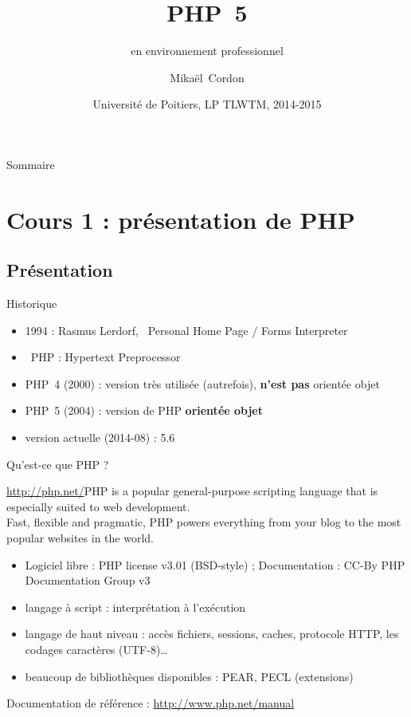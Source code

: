 \documentclass{beamer}
\title{PHP~5}
\subtitle{en environnement professionnel}
\author{Mikaël~Cordon}
\date{Université de Poitiers, LP TLWTM, 2014-2015}
\begin{document}
\begin{frame}
  \titlepage
\end{frame}

\begin{frame}{Sommaire}
  \tableofcontents[subsectionstyle=hide,subsubsectionstyle=hide]
\end{frame}

\section{Cours \textnumero{}1 : présentation de PHP}
\subsection{Présentation}
\begin{frame}{Historique}
    \begin{itemize}
	    \item 1994 : Rasmus Lerdorf, \og~Personal Home Page / Forms Interpreter~\fg
    	\item \og~PHP : Hypertext Preprocessor~\fg 
    	\item PHP~4 (2000) : version très utilisée (autrefois), \textbf{n’est pas} orientée objet
    	\item PHP~5 (2004) : version de PHP \textbf{orientée objet}
    	\item version actuelle (2014-08) : 5.6
    \end{itemize}
\end{frame}

\begin{frame}{Qu'est-ce que PHP ?}
    \begin{block}{\url{http://php.net/}}PHP is a popular general-purpose scripting language that is especially suited to web development.\\Fast, flexible and pragmatic, PHP powers everything from your blog to the most popular websites in the world.
    \end{block}
    \begin{itemize}
        \item Logiciel libre : PHP license v3.01 (BSD-style) ; Documentation : CC-By PHP Documentation Group v3
        \item langage à script : interprétation à l’exécution
        \item langage de haut niveau : accès fichiers, sessions, caches, protocole HTTP, les codages caractères (UTF-8)\ldots
        \item beaucoup de bibliothèques disponibles : PEAR, PECL (extensions)
    \end{itemize}
    Documentation de référence : \url{http://www.php.net/manual}
\end{frame}
\end{document}
